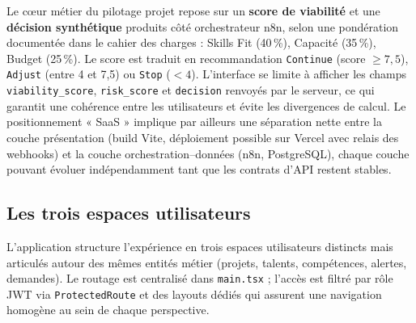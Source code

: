 Le cœur métier du pilotage projet repose sur un \textbf{score de viabilité} et une \textbf{décision synthétique} produits côté orchestrateur n8n, selon une pondération documentée dans le cahier des charges : Skills Fit (40\,\%), Capacité (35\,\%), Budget (25\,\%). Le score est traduit en recommandation \texttt{Continue} (score $\geq 7{,}5$), \texttt{Adjust} (entre 4 et 7,5) ou \texttt{Stop} ($< 4$). L'interface se limite à afficher les champs \texttt{viability\_score}, \texttt{risk\_score} et \texttt{decision} renvoyés par le serveur, ce qui garantit une cohérence entre les utilisateurs et évite les divergences de calcul. Le positionnement « SaaS » implique par ailleurs une séparation nette entre la couche présentation (build Vite, déploiement possible sur Vercel avec relais des webhooks) et la couche orchestration--données (n8n, PostgreSQL), chaque couche pouvant évoluer indépendamment tant que les contrats d'API restent stables.

\subsection{Les trois espaces utilisateurs}

L'application structure l'expérience en trois espaces utilisateurs distincts mais articulés autour des mêmes entités métier (projets, talents, compétences, alertes, demandes). Le routage est centralisé dans \texttt{main.tsx} ; l'accès est filtré par rôle JWT via \texttt{ProtectedRoute} et des layouts dédiés qui assurent une navigation homogène au sein de chaque perspective.

